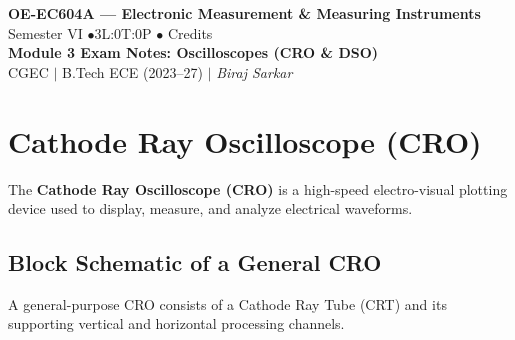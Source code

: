 \documentclass[12pt,a4paper]{article}
\begin{document}

\begin{center}
  {\LARGE\bfseries\color{myred} OE-EC604A --- Electronic Measurement \& Measuring Instruments}\\[5pt]
  {\normalsize\color{mydark} Semester VI \quad$\bullet$\quad 3L:0T:0P \quad$\bullet$ Credits}\\[3pt]
  {\normalsize\color{myteal}\textbf{Module 3 Exam Notes: Oscilloscopes (CRO \& DSO)}}\\[3pt]
  {\small\color{mydark} CGEC \;$|$\; B.Tech ECE (2023--27) \;$|$\; \textit{Biraj Sarkar}}
\end{center}
\vspace{2pt}
\noindent{\color{myred}\rule{\linewidth}{1.5pt}}
\vspace{2pt}

\hypersetup{linkcolor=mydark}
\tableofcontents
\hypersetup{linkcolor=myteal}
\newpage

\section{Cathode Ray Oscilloscope (CRO)}

The \textbf{Cathode Ray Oscilloscope (CRO)} is a high-speed electro-visual plotting device used to display, measure, and analyze electrical waveforms.

\subsection{Block Schematic of a General CRO}
A general-purpose CRO consists of a Cathode Ray Tube (CRT) and its supporting vertical and horizontal processing channels.
\end{document}
